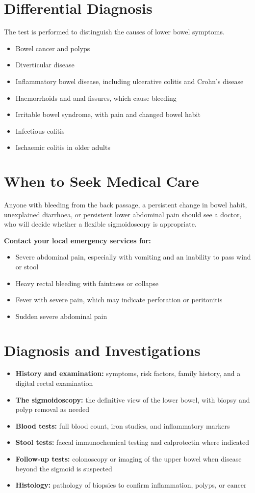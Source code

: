 \section*{Differential Diagnosis}
The test is performed to distinguish the causes of lower bowel symptoms.
\begin{itemize}
    \item Bowel cancer and polyps
    \item Diverticular disease
    \item Inflammatory bowel disease, including ulcerative colitis and Crohn's disease
    \item Haemorrhoids and anal fissures, which cause bleeding
    \item Irritable bowel syndrome, with pain and changed bowel habit
    \item Infectious colitis
    \item Ischaemic colitis in older adults
\end{itemize}

\section*{When to Seek Medical Care}
Anyone with bleeding from the back passage, a persistent change in bowel habit, unexplained diarrhoea, or persistent lower abdominal pain should see a doctor, who will decide whether a flexible sigmoidoscopy is appropriate.

\textbf{Contact your local emergency services for:}
\begin{itemize}
    \item Severe abdominal pain, especially with vomiting and an inability to pass wind or stool
    \item Heavy rectal bleeding with faintness or collapse
    \item Fever with severe pain, which may indicate perforation or peritonitis
    \item Sudden severe abdominal pain
\end{itemize}

\section*{Diagnosis and Investigations}
\begin{itemize}
    \item \textbf{History and examination:} symptoms, risk factors, family history, and a digital rectal examination
    \item \textbf{The sigmoidoscopy:} the definitive view of the lower bowel, with biopsy and polyp removal as needed
    \item \textbf{Blood tests:} full blood count, iron studies, and inflammatory markers
    \item \textbf{Stool tests:} faecal immunochemical testing and calprotectin where indicated
    \item \textbf{Follow-up tests:} colonoscopy or imaging of the upper bowel when disease beyond the sigmoid is suspected
    \item \textbf{Histology:} pathology of biopsies to confirm inflammation, polyps, or cancer
\end{itemize}

